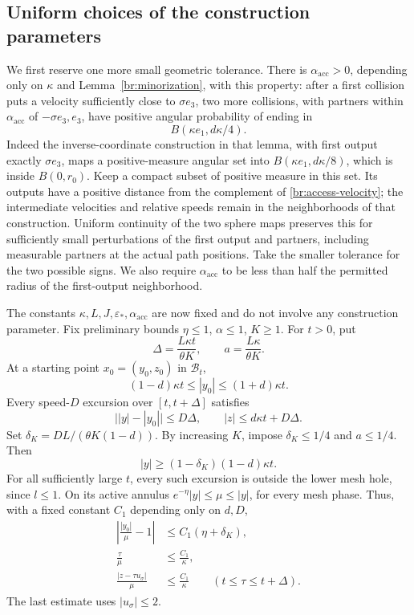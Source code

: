 \subsection{Uniform choices of the construction parameters}

We first reserve one more small geometric tolerance. There is
\(\alpha_{\mathrm{acc}}>0\), depending only on \(\kappa\) and
Lemma~\ref{br:minorization}, with this property: after a first collision
puts a velocity sufficiently close to \(\sigma e_3\), two more
collisions, with partners within \(\alpha_{\mathrm{acc}}\) of
\(-\sigma e_3,e_3\), have positive angular probability of ending in
\begin{equation}\label{br:access-velocity}
B(\kappa e_1,d\kappa/4).
\end{equation}
Indeed the inverse-coordinate construction in that lemma, with first
output exactly \(\sigma e_3\), maps a positive-measure angular set into
\(B(\kappa e_1,d\kappa/8)\), which is inside \(B(0,r_0)\).
Keep a compact subset of positive measure in this set. Its outputs
have a positive distance from the complement of
\eqref{br:access-velocity}; the intermediate velocities and relative
speeds remain in the neighborhoods of that construction. Uniform
continuity of the two sphere maps preserves this for sufficiently
small perturbations of the first output and partners, including
measurable partners at the actual path positions. Take the smaller
tolerance for the two possible signs. We also require
\(\alpha_{\mathrm{acc}}\) to be less than half the permitted radius
of the first-output neighborhood.

The constants \(\kappa,L,J,\varepsilon_*,\alpha_{\mathrm{acc}}\) are now
fixed and do not involve any construction parameter. Fix preliminary
bounds \(\eta\le1\), \(\alpha\le1\), \(K\ge1\). For \(t>0\), put
\begin{equation}\label{br:moving-box}
\Delta=\frac{L\kappa t}{\theta K},
\qquad a=\frac{L\kappa}{\theta K}.
\end{equation}
At a starting point \(x_0=(y_0,z_0)\) in \(\mathcal B_t\),
\[
(1-d)\kappa t\le|y_0|\le(1+d)\kappa t.
\]
Every speed-\(D\) excursion over \([t,t+\Delta]\) satisfies
\[
\big||y|-|y_0|\big|\le D\Delta,\qquad
|z|\le d\kappa t+D\Delta.
\]
Set \(\delta_K=DL/(\theta K(1-d))\). By increasing \(K\), impose
\(\delta_K\le1/4\) and \(a\le1/4\). Then
\[
|y|\ge(1-\delta_K)(1-d)\kappa t.
\]
For all sufficiently large \(t\), every such excursion is outside the
lower mesh hole, since \(l\le1\). On its active annulus
\(e^{-\eta}|y|\le\mu\le|y|\), for every mesh phase. Thus, with a fixed
constant \(C_1\) depending only on \(d,D\),
\begin{equation}\label{br:comparison-quantities}
\begin{split}
\left|\frac{|y_0|}{\mu}-1\right|&\le C_1(\eta+\delta_K),\\
\frac{\tau}{\mu}&\le\frac{C_1}{\kappa},\\
\frac{|z-\tau u_\sigma|}{\mu}&\le\frac{C_1}{\kappa}
\qquad(t\le\tau\le t+\Delta).
\end{split}
\end{equation}
The last estimate uses \(|u_\sigma|\le2\).

